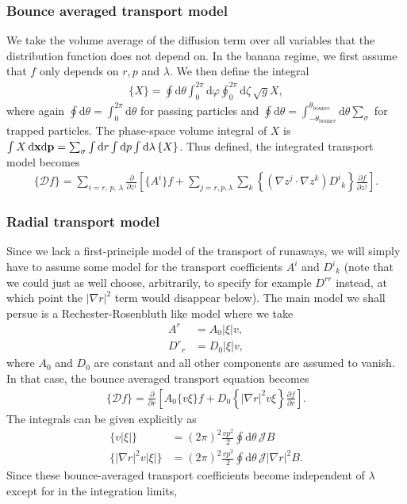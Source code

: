 \documentclass[11pt,a4paper]{article}
\newcommand{\rd}{\ensuremath{\mathrm{d}}}
\newcommand{\sub}[1]{\ensuremath{_{\text{#1}}}}
\renewcommand{\b}[1]{\ensuremath{ {\bf #1 } }}
\begin{document}
\subsubsection*{Bounce averaged transport model}
We take the volume average of the diffusion term over all variables that the distribution function does not depend on. In the banana regime, we first assume that $f$ only depends on $r$,\,$p$ and $\lambda$. We then define the integral
\begin{align}
\{ X \} = \oint \rd \theta \int_0^{2\pi} \rd \varphi \oint_0^{2\pi}\rd \zeta \,\sqrt{g} X,
\end{align}
where again $\oint \rd \theta = \int_0^{2\pi} \rd \theta$ for passing particles and $\oint \rd \theta = \int_{-\theta\sub{bounce}}^{\theta\sub{bounce}}\rd \theta \sum_\sigma $ for trapped particles.
The phase-space volume integral of $X$ is $\int X \,\rd\b{x}\rd \b{p} = \sum_\sigma \int \rd r \int \rd p \int \rd \lambda \,\{X\}$.
Thus defined, the integrated transport model becomes
\begin{align}
\{\mathcal{D}f\} = \sum_{i = r,\,p,\,\lambda} \frac{\partial}{\partial z^i} \left[\{A^i\} f +\sum_{j=r,p,\lambda}\sum_k  \left\{(\nabla z^j \cdot \nabla z^k){D^i}_k\right\}\frac{\partial f}{\partial z^j}\right].
\end{align}

\subsubsection*{Radial transport model}

Since we lack a first-principle model of the transport of runaways, we will simply have to assume some model for the transport coefficients $A^i$ and ${D^i}_k$ (note that we could just as well choose, arbitrarily, to specify for example $D^{rr}$ instead, at which point the $|\nabla r|^2$ term would disappear below). The main model we shall persue is a Rechester-Rosenbluth like model where we take
\begin{align}
A^r &= A_0 |\xi| v, \nonumber \\
{D^r}_r &= D_0 |\xi| v,
\end{align}
where $A_0$ and $D_0$ are constant and all other components are assumed to vanish. In that case, the bounce averaged transport equation becomes
\begin{align}
\{\mathcal{D}f\} = \frac{\partial}{\partial r}\left[A_0\{v \xi\} f +D_0\left\{|\nabla r|^2v\xi\right\}\frac{\partial f}{\partial r}\right].
\end{align}
The integrals can be given explicitly as
\begin{align}
\{v |\xi|\} &= (2\pi)^2 \frac{vp^2}{2} \oint \rd \theta \, \mathcal{J} B \nonumber \\
\{|\nabla r|^2 v|\xi|\} &= (2\pi)^2 \frac{vp^2}{2} \oint \rd \theta \, \mathcal{J} |\nabla r|^2B.
\end{align}
Since these bounce-averaged transport coefficients become independent of $\lambda$ except for in the integration limits, 
\end{document}
